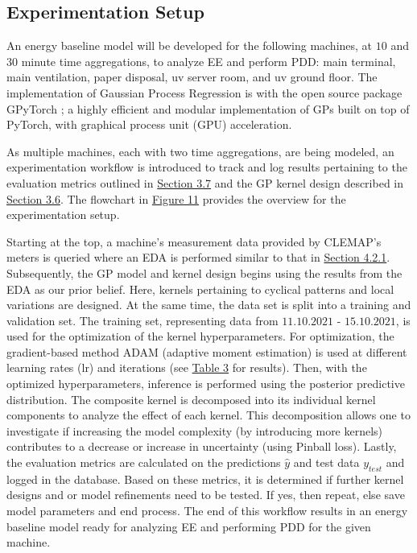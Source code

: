 \subsection{Experimentation Setup}

An energy baseline model will be developed for the following machines, at $10$ and $30$ minute time aggregations, to analyze EE and perform PDD: main terminal, main ventilation, paper disposal, uv server room, and uv ground floor. The implementation of Gaussian Process Regression is with the open source package GPyTorch \cite{gardner2018gpytorch}; a highly efficient and modular implementation of GPs built on top of PyTorch, with graphical process unit (GPU) acceleration. 

As multiple machines, each with two time aggregations, are being modeled, an experimentation workflow is introduced to track and log results pertaining to the evaluation metrics outlined in \hyperlink{subsection.3.7}{Section 3.7} and the GP kernel design described in \hyperlink{subsection.3.6}{Section 3.6}. The flowchart in \hyperlink{figure.11}{Figure 11} provides the overview for the experimentation setup. 

Starting at the top, a machine's measurement data provided by CLEMAP's meters is queried where an EDA is performed similar to that in \hyperlink{subsubsection.4.2.1}{Section 4.2.1}. Subsequently, the GP model and kernel design begins using the results from the EDA as our prior belief. Here, kernels pertaining to cyclical patterns and local variations are designed. At the same time, the data set is split into a training and validation set. The training set, representing data from $11.10.2021$ - $15.10.2021$, is used for the optimization of the kernel hyperparameters. For optimization, the gradient-based method ADAM (adaptive moment estimation) \cite{pml1Book} is used at different learning rates (lr) and iterations (see \hyperlink{table.3}{Table 3} for results). Then, with the optimized hyperparameters, inference is performed using the posterior predictive distribution. The composite kernel is decomposed into its individual kernel components to analyze the effect of each kernel. This decomposition allows one to investigate if increasing the model complexity (by introducing more  kernels) contributes to a decrease or increase in uncertainty (using Pinball loss). Lastly, the evaluation metrics are calculated on the predictions $\hat{y}$ and test data $y_{test}$ and logged in the database. Based on these metrics, it is determined if further kernel designs and or model refinements need to be tested. If yes, then repeat, else save model parameters and end process. The end of this workflow results in an energy baseline model ready for analyzing EE and performing PDD for the given machine.   

